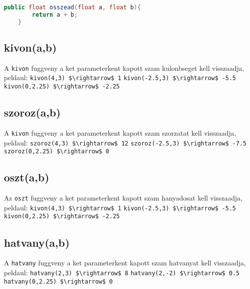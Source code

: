 \documentclass{article}
\begin{document}
    \begin{lstlisting}[language=Java, caption=Pelda Metodus]
	public float osszead(float a, float b){
		return a + b;
	}
    \end{lstlisting}

    \subsection{kivon(a,b)}
    A \lstinline{kivon} fuggveny a ket parameterkent kapott szam kulonbseget kell visszaadja, peldaul:\newline
    \lstinline[mathescape]{kivon(4,3) $\rightarrow$ 1}\newline
    \lstinline[mathescape]{kivon(-2.5,3) $\rightarrow$ -5.5}\newline
    \lstinline[mathescape]{kivon(0,2.25) $\rightarrow$ -2.25}\newline

    \subsection{szoroz(a,b)}
    A \lstinline{kivon} fuggveny a ket parameterkent kapott szam szorzatat kell visszaadja, peldaul:\newline
    \lstinline[mathescape]{szoroz(4,3) $\rightarrow$ 12}\newline
    \lstinline[mathescape]{szoroz(-2.5,3) $\rightarrow$ -7.5}\newline
    \lstinline[mathescape]{szoroz(0,2.25) $\rightarrow$ 0}\newline

    \subsection{oszt(a,b)}
    Az \lstinline{oszt} fuggveny a ket parameterkent kapott szam hanyadosat kell visszaadja, peldaul:\newline
    \lstinline[mathescape]{kivon(4,3) $\rightarrow$ 1}\newline
    \lstinline[mathescape]{kivon(-2.5,3) $\rightarrow$ -5.5}\newline
    \lstinline[mathescape]{kivon(0,2.25) $\rightarrow$ -2.25}\newline

    \subsection{hatvany(a,b)}
    A \lstinline{hatvany} fuggveny a ket parameterkent kapott szam hatvanyat kell visszaadja, peldaul:\newline
    \lstinline[mathescape]{hatvany(2,3) $\rightarrow$ 8}\newline
    \lstinline[mathescape]{hatvany(2,-2) $\rightarrow$ 0.5}\newline
    \lstinline[mathescape]{hatvany(0,2.25) $\rightarrow$ 0}\newline
\end{document}
